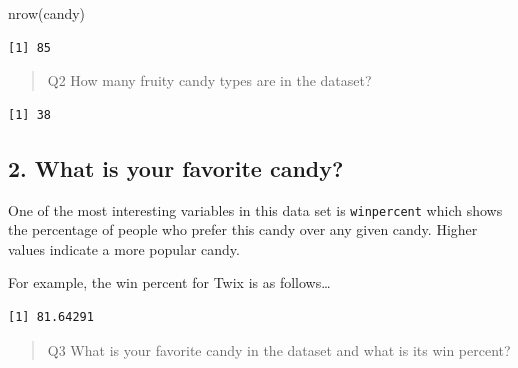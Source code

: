 \documentclass[
  letterpaper,
  DIV=11,
  numbers=noendperiod]{scrartcl}
\newenvironment{Shaded}{\begin{snugshade}}{\end{snugshade}}
\newcommand{\FunctionTok}[1]{\textcolor[rgb]{0.28,0.35,0.67}{#1}}
\newcommand{\NormalTok}[1]{\textcolor[rgb]{0.00,0.23,0.31}{#1}}
\newcommand{\SpecialCharTok}[1]{\textcolor[rgb]{0.37,0.37,0.37}{#1}}
\newcommand{\StringTok}[1]{\textcolor[rgb]{0.13,0.47,0.30}{#1}}
\begin{document}
\begin{Shaded}
\begin{Highlighting}[]
\FunctionTok{nrow}\NormalTok{(candy)}
\end{Highlighting}
\end{Shaded}

\begin{verbatim}
[1] 85
\end{verbatim}

\begin{quote}
Q2 How many fruity candy types are in the dataset?
\end{quote}

\begin{Shaded}
\end{Shaded}

\begin{verbatim}
[1] 38
\end{verbatim}

\subsection{2. What is your favorite
candy?}\label{what-is-your-favorite-candy}

One of the most interesting variables in this data set is
\texttt{winpercent} which shows the percentage of people who prefer this
candy over any given candy. Higher values indicate a more popular candy.

For example, the win percent for Twix is as follows\ldots{}

\begin{Shaded}
\end{Shaded}

\begin{verbatim}
[1] 81.64291
\end{verbatim}

\begin{quote}
Q3 What is your favorite candy in the dataset and what is its win
percent?
\end{quote}

\begin{Shaded}
\end{Shaded}
\end{document}
